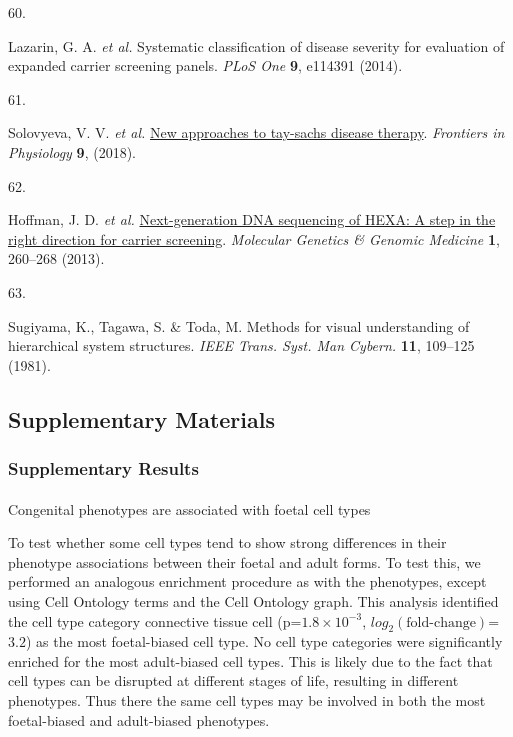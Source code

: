 \documentclass[
]{article}
\makeatletter
\let\oldparagraph\paragraph
\renewcommand{\paragraph}{
    \@ifstar
      \xxxParagraphStar
      \xxxParagraphNoStar
  }
\newcommand{\xxxParagraphStar}[1]{\oldparagraph*{#1}\mbox{}}
\newcommand{\xxxParagraphNoStar}[1]{\oldparagraph{#1}\mbox{}}
\newlength{\cslhangindent}
\newlength{\csllabelwidth}
\newenvironment{CSLReferences}[2] %
 {\begin{list}{}{%
  \setlength{\itemindent}{0pt}
  \setlength{\leftmargin}{0pt}
  \setlength{\parsep}{0pt}
  \ifodd #1
   \setlength{\leftmargin}{\cslhangindent}
   \setlength{\itemindent}{-1\cslhangindent}
  \fi
  \setlength{\itemsep}{#2\baselineskip}}}
 {\end{list}}
\newcommand{\CSLLeftMargin}[1]{\parbox[t]{\csllabelwidth}{\strut#1\strut}}
\newcommand{\CSLRightInline}[1]{\parbox[t]{\linewidth - \csllabelwidth}{\strut#1\strut}}
\makeatother
\begin{document}
\begin{CSLReferences}{0}{0}
\CSLLeftMargin{60. }%
\CSLRightInline{Lazarin, G. A. \emph{et al.} Systematic classification
of disease severity for evaluation of expanded carrier screening panels.
\emph{PLoS One} \textbf{9}, e114391 (2014).}

\CSLLeftMargin{61. }%
\CSLRightInline{Solovyeva, V. V. \emph{et al.}
\href{https://doi.org/10.3389/fphys.2018.01663}{New approaches to
tay-sachs disease therapy}. \emph{Frontiers in Physiology} \textbf{9},
(2018).}

\CSLLeftMargin{62. }%
\CSLRightInline{Hoffman, J. D. \emph{et al.}
\href{https://doi.org/10.1002/mgg3.37}{Next-generation DNA sequencing of
HEXA: A step in the right direction for carrier screening}.
\emph{Molecular Genetics \& Genomic Medicine} \textbf{1}, 260--268
(2013).}

\CSLLeftMargin{63. }%
\CSLRightInline{Sugiyama, K., Tagawa, S. \& Toda, M. Methods for visual
understanding of hierarchical system structures. \emph{IEEE Trans. Syst.
Man Cybern.} \textbf{11}, 109--125 (1981).}

\end{CSLReferences}

\hfill\break

\newpage

\subsection{Supplementary Materials}\label{supplementary-materials}

\subsubsection{Supplementary Results}\label{supplementary-results}

\paragraph{Congenital phenotypes are associated with foetal cell
types}\label{congenital-phenotypes-are-associated-with-foetal-cell-types-2}

To test whether some cell types tend to show strong differences in their
phenotype associations between their foetal and adult forms. To test
this, we performed an analogous enrichment procedure as with the
phenotypes, except using Cell Ontology terms and the Cell Ontology
graph. This analysis identified the cell type category connective tissue
cell (p=\(1.8 \times 10^{-3}\), \(log_2(\text{fold-change})\)=\(3.2\))
as the most foetal-biased cell type. No cell type categories were
significantly enriched for the most adult-biased cell types. This is
likely due to the fact that cell types can be disrupted at different
stages of life, resulting in different phenotypes. Thus there the same
cell types may be involved in both the most foetal-biased and
adult-biased phenotypes.
\end{document}
